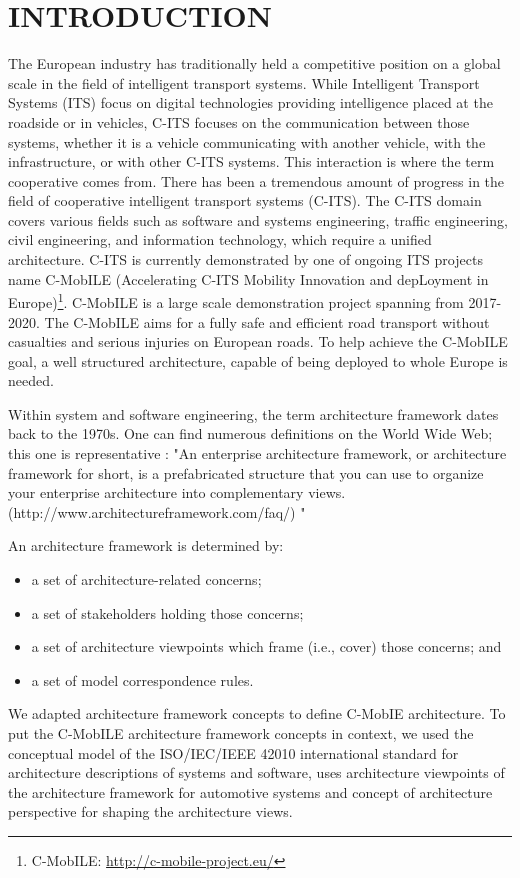 \documentclass[letterpaper, 10 pt, conference]{ieeeconf}  %
\begin{document}
\section{INTRODUCTION}
The European industry has traditionally held a competitive position on a global scale in the field of intelligent transport systems. While Intelligent Transport Systems (ITS) focus on digital technologies providing intelligence placed at the roadside or in vehicles, C-ITS focuses on the communication between those systems, whether it is a vehicle communicating with another vehicle, with the infrastructure, or with other C-ITS systems. This interaction is where the term cooperative comes from. There has been a tremendous amount of progress in the field of cooperative intelligent transport systems (C-ITS). The C-ITS domain covers various fields such as software and systems engineering, traffic engineering, civil engineering, and information technology, which require a unified architecture. C-ITS is currently demonstrated by one of ongoing ITS projects name C-MobILE (Accelerating C-ITS Mobility Innovation and depLoyment in Europe)\footnote{C-MobILE: \url{http://c-mobile-project.eu/}}. C-MobILE is a large scale demonstration project spanning from 2017-2020. The C-MobILE aims for a fully safe and efficient road transport without casualties and serious injuries on European roads. To help achieve the C-MobILE goal, a well structured architecture, capable of being deployed to whole Europe is needed.

Within system and software engineering, the term architecture framework dates back to the 1970s. One can find numerous definitions on the World Wide Web; this one is representative \cite{zachman1} :
"An enterprise architecture framework, or architecture framework for short, is a prefabricated structure that you can use to organize your enterprise architecture into complementary views. (http://www.architectureframework.com/faq/) "

An architecture framework is determined by:
\begin{itemize}
	\item a set of architecture-related concerns;
	\item a set of stakeholders holding those concerns;
	\item a set of architecture viewpoints which frame (i.e., cover) those concerns; and
	\item a set of model correspondence rules.
\end{itemize}
We adapted architecture framework concepts to define C-MobIE architecture. To put the C-MobILE architecture framework concepts in context, we used the conceptual model of the ISO/IEC/IEEE 42010 international standard for architecture descriptions of systems and software\cite{arch_framework}, uses architecture viewpoints of the architecture framework for automotive systems\cite{yd} and concept of architecture perspective for shaping the architecture views\cite{woods}.
\end{document}
